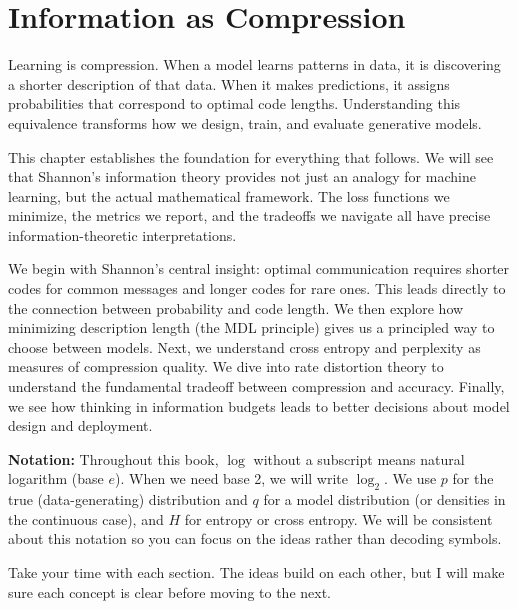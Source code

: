 
\chapter{Information as Compression}

\begin{keyinsight}
Learning is compression. When a model learns patterns in data, it is discovering a shorter description of that data. When it makes predictions, it assigns probabilities that correspond to optimal code lengths. Understanding this equivalence transforms how we design, train, and evaluate generative models.
\end{keyinsight}

\vspace{1.5em}

This chapter establishes the foundation for everything that follows. We will see that Shannon's information theory provides not just an analogy for machine learning, but the actual mathematical framework. The loss functions we minimize, the metrics we report, and the tradeoffs we navigate all have precise information-theoretic interpretations.

We begin with Shannon's central insight: optimal communication requires shorter codes for common messages and longer codes for rare ones. This leads directly to the connection between probability and code length. We then explore how minimizing description length (the MDL principle) gives us a principled way to choose between models. Next, we understand cross entropy and perplexity as measures of compression quality. We dive into rate distortion theory to understand the fundamental tradeoff between compression and accuracy. Finally, we see how thinking in information budgets leads to better decisions about model design and deployment.

\textbf{Notation:} Throughout this book, $\log$ without a subscript means natural logarithm (base $e$). When we need base 2, we will write $\log_2$. We use $p$ for the true (data-generating) distribution and $q$ for a model distribution (or densities in the continuous case), and $H$ for entropy or cross entropy. We will be consistent about this notation so you can focus on the ideas rather than decoding symbols.

Take your time with each section. The ideas build on each other, but I will make sure each concept is clear before moving to the next.

